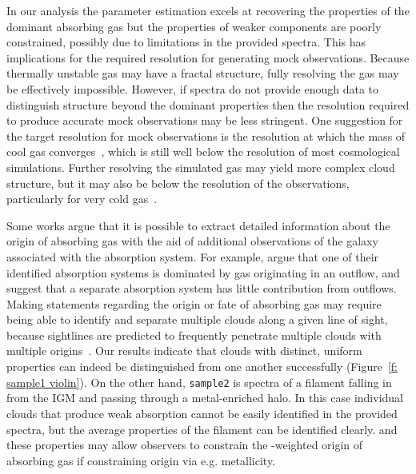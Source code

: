 \documentclass[fleqn,usenatbib]{mnras}
\begin{document}
In our analysis the parameter estimation excels at recovering the properties of the dominant absorbing gas
but the properties of weaker components are poorly constrained,
possibly due to limitations in the provided spectra.
This has implications for the required resolution for generating mock observations.
Because thermally unstable gas may have a fractal structure, fully resolving the gas may be effectively impossible.
However, if spectra do not provide enough data to distinguish structure beyond the dominant properties then the resolution required to produce accurate mock observations may be less stringent.
One suggestion for the target resolution for mock observations is the resolution at which the mass of cool gas converges~\citep[e.g.][though such a scale may not exist]{mccourt2018Characteristic},
which is still well below the resolution of most cosmological simulations.
Further resolving the simulated gas may yield more complex cloud structure,
but it may also be below the resolution of the observations, particularly for very cold gas~\citep[e.g.][]{jones2010Bare}.

Some works argue that it is possible to extract detailed information about the origin of absorbing gas with the aid of additional observations of the galaxy associated with the absorption system.
For example, \cite{peroux2013SINFONI} argue that one of their identified absorption systems is dominated by gas originating in an outflow, and \cite{peroux2017Nature} suggest that a separate absorption system has little contribution from outflows.
Making statements regarding the origin or fate of absorbing gas may require being able to identify and separate multiple clouds along a given line of sight,
because sightlines are predicted to frequently penetrate multiple clouds with multiple origins~\citep[e.g.][]{hafen2019Origins, hafen2020Fates}.
Our results indicate that clouds with distinct, uniform properties can indeed be distinguished from one another successfully (Figure~\ref{f: sample1 violin}).
On the other hand, \texttt{sample2} is spectra of a filament falling in from the IGM and passing through a metal-enriched halo.
In this case individual clouds that produce weak absorption cannot be easily identified in the provided spectra,
but the average properties of the filament can be identified clearly.
and these properties may allow observers to constrain the -weighted origin of absorbing gas if constraining origin via e.g. metallicity.
\end{document}
